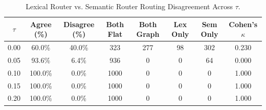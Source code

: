 \begin{table}[t]
\centering
\small
\caption{Lexical Router vs. Semantic Router Routing Disagreement Across $\tau$.}
\label{tab:router_disagreement}
\begin{tabular}{cccccccc}
\toprule
\textbf{$\tau$} & \textbf{Agree (\%)} & \textbf{Disagree (\%)} & \textbf{Both Flat} & \textbf{Both Graph} & \textbf{Lex Only} & \textbf{Sem Only} & \textbf{Cohen's $\kappa$} \\
\midrule
0.00 &  60.0\% &  40.0\% & 323 & 277 & 98 & 302 & 0.230 \\
0.05 &  93.6\% &   6.4\% & 936 & 0 & 0 & 64 & 0.000 \\
0.10 & 100.0\% &   0.0\% & 1000 & 0 & 0 & 0 & 1.000 \\
0.15 & 100.0\% &   0.0\% & 1000 & 0 & 0 & 0 & 1.000 \\
0.20 & 100.0\% &   0.0\% & 1000 & 0 & 0 & 0 & 1.000 \\
\bottomrule
\end{tabular}
\end{table}